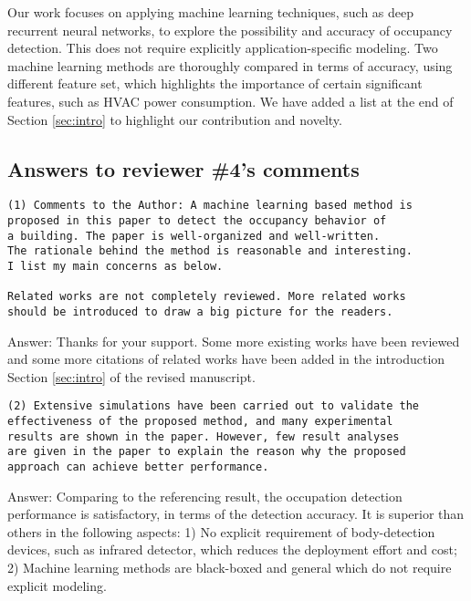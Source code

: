Our work focuses on applying machine learning techniques, such as deep
recurrent neural networks, to explore the possibility and accuracy of
occupancy detection. This does not require explicitly
application-specific modeling.  Two machine learning methods are
thoroughly compared in terms of accuracy, using different feature set,
which highlights the importance of certain significant features, such
as HVAC power consumption. We have added a list at the end of Section
\ref{sec:intro} to highlight our contribution and novelty.

\subsection{Answers to reviewer \#4's comments}
\begin{verbatim}
(1) Comments to the Author: A machine learning based method is
proposed in this paper to detect the occupancy behavior of
a building. The paper is well-organized and well-written.
The rationale behind the method is reasonable and interesting.
I list my main concerns as below.

Related works are not completely reviewed. More related works
should be introduced to draw a big picture for the readers.
\end{verbatim}

Answer: Thanks for your support. Some more existing works have been reviewed
and some more citations of related works have been added in the introduction
Section \ref{sec:intro} of the revised manuscript.



\begin{verbatim}
(2) Extensive simulations have been carried out to validate the
effectiveness of the proposed method, and many experimental
results are shown in the paper. However, few result analyses
are given in the paper to explain the reason why the proposed
approach can achieve better performance.
\end{verbatim}

Answer: Comparing to the referencing result, the occupation detection
performance is satisfactory, in terms of the detection accuracy. It is
superior than others in the following aspects: 1) No explicit
requirement of body-detection devices, such as infrared detector,
which reduces the deployment effort and cost; 2) Machine learning
methods are black-boxed and general which do not require explicit
modeling.

